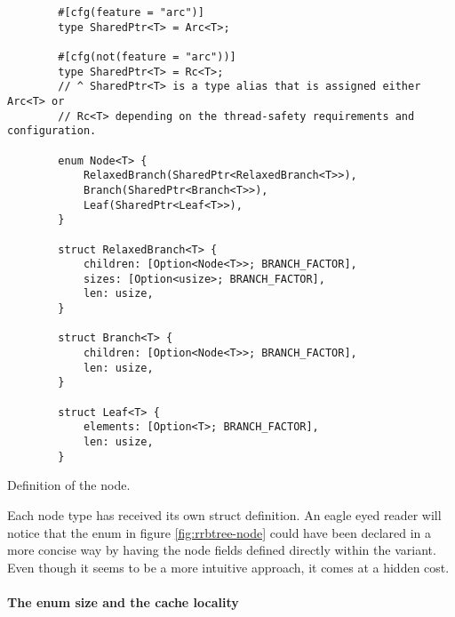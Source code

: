 \begin{listing}[!ht]

    \centering
    \begin{verbatim}
        #[cfg(feature = "arc")]
        type SharedPtr<T> = Arc<T>;

        #[cfg(not(feature = "arc"))]
        type SharedPtr<T> = Rc<T>;
        // ^ SharedPtr<T> is a type alias that is assigned either Arc<T> or
        // Rc<T> depending on the thread-safety requirements and configuration.

        enum Node<T> {
            RelaxedBranch(SharedPtr<RelaxedBranch<T>>),
            Branch(SharedPtr<Branch<T>>),
            Leaf(SharedPtr<Leaf<T>>),
        }

        struct RelaxedBranch<T> {
            children: [Option<Node<T>>; BRANCH_FACTOR],
            sizes: [Option<usize>; BRANCH_FACTOR],
            len: usize,
        }

        struct Branch<T> {
            children: [Option<Node<T>>; BRANCH_FACTOR],
            len: usize,
        }

        struct Leaf<T> {
            elements: [Option<T>; BRANCH_FACTOR],
            len: usize,
        }
    \end{verbatim}

    \caption{Definition of the \rrbtree{} node.}
    \label{fig:rrbtree-node}
\end{listing}

Each node type has received its own struct definition. An eagle eyed reader will notice that the  enum in figure \ref{fig:rrbtree-node} could have been declared in a more concise way by having the node fields defined directly within the variant. Even though it seems to be a more intuitive approach, it comes at a hidden cost.

\paragraph{The enum size and the cache locality}


